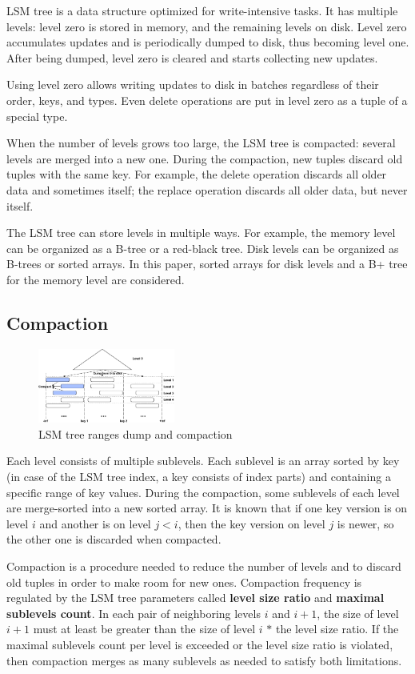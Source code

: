 \documentclass{vldb}
\begin{document}
LSM tree is a data structure optimized for write-intensive tasks. It has
multiple levels: level zero is stored in memory, and the remaining levels on disk.
Level zero accumulates updates and is periodically dumped to disk, thus becoming
level one. After being dumped, level zero is cleared and starts collecting new updates.

Using level zero allows writing updates to disk in batches regardless of
their order, keys, and types. Even delete operations are put in level zero as a tuple of a
special type.

When the number of levels grows too large, the LSM tree is compacted: several levels are
merged into a new one. During the compaction, new tuples discard old tuples with the same
key. For example, the delete operation discards all older data and sometimes itself; the replace
operation discards all older data, but never itself.

The LSM tree can store levels in multiple ways. For example, the memory level can be
organized as a B-tree or a red-black tree. Disk levels can be organized as B-trees or sorted
arrays. In this paper, sorted arrays for disk levels and a B+ tree for the memory level
are considered.

\subsection{Compaction}
\begin{figure}
\centering
\includegraphics[width=0.4\textwidth]{compaction_schema}
\caption{LSM tree ranges dump and compaction}
\label{fig:compaction_schema}
\end{figure}
Each level consists of multiple sublevels. Each sublevel is an array sorted by
key (in case of the LSM tree index, a key consists of index parts) and
containing a specific range of key values. During the compaction, some sublevels of each
level are merge-sorted into a new sorted array. It is known that if one key
version is on level $i$ and another is on level $j < i$, then the key version on level
$j$ is newer, so the other one is discarded when compacted.

Compaction is a procedure needed to reduce the number of levels and to discard old tuples
in order to make room for new ones. Compaction frequency is regulated by the LSM tree
parameters called \textbf{level size ratio} and \textbf{maximal sublevels count}. In each pair of
neighboring levels $i$ and $i + 1$, the size of level $i + 1$ must at least be greater than
the size of level $i$ $*$ the level size ratio. If the maximal sublevels count per
level is exceeded or the level size ratio is violated, then compaction merges as many
sublevels as needed to satisfy both limitations.
\end{document}
